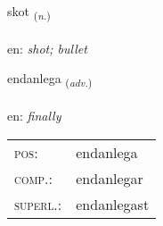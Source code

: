 \documentclass[frontgrid, backgrid]{flacards}\usepackage[]{graphicx}\usepackage[]{xcolor}
\begin{document}
\renewcommand{\flhead}{\vskip5pt \fboxsep=0pt {\small\bfseries\footnotesize Nafnorð | Noun}}
\renewcommand{\fcfoot}{\vskip5pt \fboxsep=0pt \hspace{2pt}{\small\bfseries\footnotesize 3K}}

\renewcommand{\blhead}{\vskip5pt {\small\bfseries\footnotesize Nafnorð | Noun }}
\renewcommand{\bcfoot}{\vskip5pt \hspace{2pt}{\small\bfseries\footnotesize 3K}}


{skot \small{\textsubscript{(\textit{n.})}} \\[1ex] %
\textphonetic{[skɔːt]} \\
en: \emph{shot; bullet} \\  [2ex]
\renewcommand*{\arraystretch}{0.8}
}

\renewcommand{\flhead}{\vskip5pt \fboxsep=0pt {\small\bfseries\footnotesize Atviksorð | Adverb}}
\renewcommand{\fcfoot}{\vskip5pt \fboxsep=0pt \hspace{2pt}{\small\bfseries\footnotesize 3K}}

\renewcommand{\blhead}{\vskip5pt {\small\bfseries\footnotesize Atviksorð | Adverb }}
\renewcommand{\bcfoot}{\vskip5pt \hspace{2pt}{\small\bfseries\footnotesize 3K}}


{endanlega \small{\textsubscript{(\textit{adv.})}} \\[1ex] %
\textphonetic{[ɛntanlɛɣa]} \\
en: \emph{finally} \\  [2ex]
\renewcommand*{\arraystretch}{0.8}
\begin{tabular}{ll}
\textsc{pos}: & endanlega \\ 
\textsc{comp.}: & endanlegar \\ 
\textsc{superl.}: & endanlegast \\
\end{tabular}
}
\end{document}
